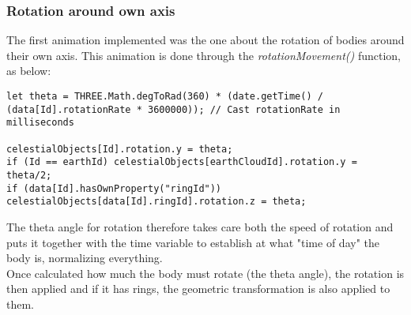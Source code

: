 \documentclass{article}
\begin{document}
\subsubsection{Rotation around own axis}
The first animation implemented was the one about the rotation of bodies around their own axis. This animation is done through the \textit{rotationMovement()} function, as below:
\begin{lstlisting}
let theta = THREE.Math.degToRad(360) * (date.getTime() / (data[Id].rotationRate * 3600000)); // Cast rotationRate in milliseconds

celestialObjects[Id].rotation.y = theta;
if (Id == earthId) celestialObjects[earthCloudId].rotation.y = theta/2;
if (data[Id].hasOwnProperty("ringId")) celestialObjects[data[Id].ringId].rotation.z = theta;
\end{lstlisting}
The theta angle for rotation therefore takes care both the speed of rotation and puts it together with the time variable to establish at what "time of day" the body is, normalizing everything.\\
Once calculated how much the body must rotate (the theta angle), the rotation is then applied and if it has rings, the geometric transformation is also applied to them.
\end{document}
